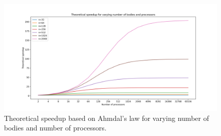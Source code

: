 \documentclass[a4paper,11pt]{scrartcl} %
\begin{document}
\begin{figure}[h!]
  \centering
  \includegraphics[width=\textwidth]{img/speedup.png}
  \caption{Theoretical speedup based on Ahmdal's law for varying number of bodies and number of processors.}
  \label{fig:speedup}
\end{figure}


\newpage

\end{document}
